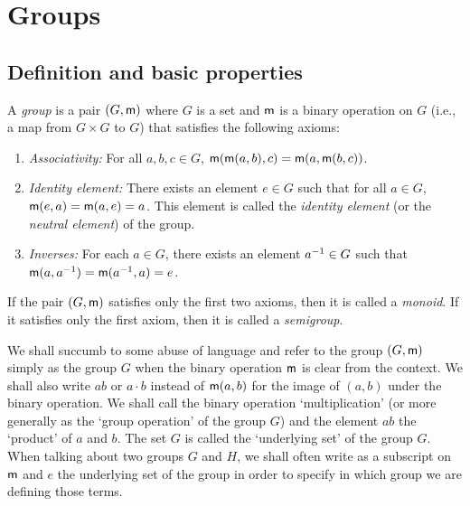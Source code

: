 \chapter{Groups}
\label{ch:groups}

\section{Definition and basic properties}

\begin{definition}
    \label{def:group}
    A \emph{group} is a pair \((G, {\mathsf{m}})\) where \(G\) is a  set and \({\mathsf{m}}\)
    is a binary operation on \(G\) (i.e., a map from \(G \times G\) to \(G\))
    that satisfies the following axioms:
    \begin{enumerate}
        \item \emph{Associativity:} For all \(a, b, c \in G\), \({\mathsf{m}}({\mathsf{m}}(a,
        b), c) = {\mathsf{m}}(a, {\mathsf{m}}(b, c))\).
        \item \emph{Identity element:} There exists an element \(e \in G\) such
        that for all \(a \in G\), \({\mathsf{m}}(e, a) = {\mathsf{m}}(a, e) = a\). This
        element is called the \emph{identity element} (or the \emph{neutral
        element}) of the group.
        \item \emph{Inverses:} For each \(a \in G\), there exists an element
        \(a^{-1} \in G\) such that \({\mathsf{m}}(a, a^{-1}) = {\mathsf{m}}(a^{-1}, a) = e\).
    \end{enumerate}
\end{definition}

If the pair \((G, {\mathsf{m}})\) satisfies only the first two axioms, then it is
called a \emph{monoid}. If it satisfies only the first axiom, then it is called
a \emph{semigroup}.

We shall succumb to some abuse of language and refer to the group \((G, {\mathsf{m}})\)
simply as the group \(G\) when the binary operation \({\mathsf{m}}\) is clear from the
context. We shall also write \(ab\) or \(a \cdot b\) instead of \({\mathsf{m}}(a, b)\)
for the image of \((a, b)\) under the binary operation. We shall call the binary
operation `multiplication' (or more generally as the `group operation' of the
group \(G\)) and the element \(ab\) the `product' of \(a\) and \(b\). The set
\(G\) is called the `underlying set' of the group \(G\). When talking about two
groups \(G\) and \(H\), we shall often write as a subscript on \({\mathsf{m}}\) and
\(e\) the underlying set of the group in order to specify in which group we are
defining those terms.

